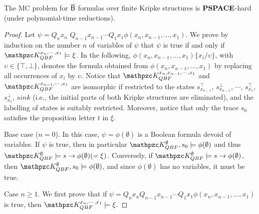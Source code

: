 \begin{theorem}\label{th:ABbarHard}
The MC problem for $\mathsf{\overline{B}}$ formulas over finite Kripke structures is $\textbf{PSPACE}$-hard (under polynomial-time reductions).
\end{theorem}
\begin{proof}
Let $\psi=Q_n x_n$ $Q_{n-1} x_{n-1} \cdots Q_1 x_1 \phi(x_n,x_{n-1},\ldots ,x_1)$.
We prove by induction on the number $n$ of variables of $\psi$ that $\psi$ is true 
if and only if $\Ku_{QBF}^{x_n,\cdots , x_1}\models\xi$. In the following, $\phi(x_n,x_{n-1},\ldots , x_1)\{x_i/\upsilon\}$, with $\upsilon\in\{\top ,\bot\}$, denotes the formula obtained from $\phi(x_n,x_{n-1},\ldots ,x_1)$ by replacing all 
occurrences of $x_i$ by $\upsilon$. 
Notice that $\Ku_{QBF}^{x_n,x_{n-1},\cdots , x_1}$ and $\Ku_{QBF}^{x_{n-1},\cdots , x_1}$ are isomorphic if restricted to the states 
$s_{x_{n-1}}^\top$, $s_{x_{n-1}}^\bot$, $\cdots$, $s_{x_1}^\top$, $s_{x_1}^\bot$, $sink$ (i.e., the initial parts of both Kripke structures are eliminated), and the labelling of states is suitably restricted. Moreover, notice that only the trace $s_0$ satisfies the proposition letter $t$ in $\xi$.

Base case ($n=0$). In this case, $\psi=\phi(\emptyset)$ is a Boolean formula devoid of variables. 
If $\psi$ is true, then in particular $\Ku_{QBF}^{\emptyset},s_0\models\phi(\emptyset)$ and thus $\Ku_{QBF}^{\emptyset}\models s\rightarrow \phi(\emptyset)(=\xi)$. Conversely, if $\Ku_{QBF}^{\emptyset}\models s\rightarrow \phi(\emptyset)$, then $\Ku_{QBF}^{\emptyset},s_0\models\phi(\emptyset)$, and since $\phi(\emptyset)$ has no variables, it must be true.

Case $n\geq 1$.
We first prove that if $\psi\!=\!Q_n x_n Q_{n-1} x_{n-1}\!\cdots Q_1 x_1 \phi(x_n,x_{n-1},\ldots\! , x_1)$ is true, then $\Ku_{QBF}^{x_n,\cdots , x_1}\models\xi$. 


\end{proof}
